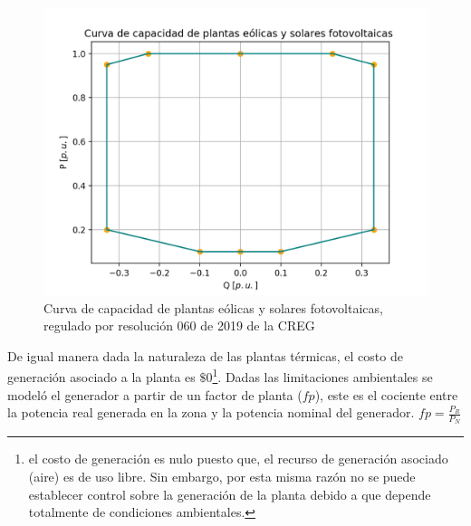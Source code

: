\documentclass{article}
\begin{document}
\begin{figure}[H]
    \centering
    \includegraphics[scale=0.7]{CREG.png}
    \caption{Curva de capacidad de plantas eólicas y solares fotovoltaicas, regulado por resolución 060 de 2019 de la CREG}
    \label{LimitesEolica}
\end{figure}

De igual manera dada la naturaleza de las plantas térmicas, el costo de generación asociado a la planta es $\$0$\footnote{el costo de generación es nulo puesto que, el recurso de generación asociado (aire) es de uso libre. Sin embargo, por esta misma razón no se puede establecer control sobre la generación de la planta debido a que depende totalmente de condiciones ambientales.}. Dadas las limitaciones ambientales se modeló el generador a partir de un factor de planta ($fp$), este es el cociente entre la potencia real generada en la zona y la potencia nominal del generador. $fp=\frac{P_R}{P_N}$  \\
\end{document}
